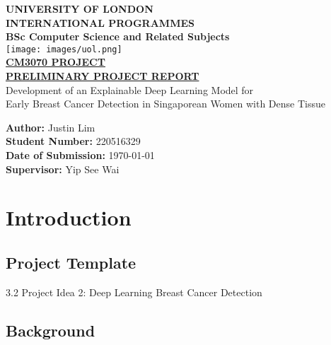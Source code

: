 \documentclass[12pt]{article}
\begin{document}
\begin{titlepage}
    \centering
    \vspace*{2cm}

    {\LARGE\bfseries UNIVERSITY OF LONDON \\[0.5em]
    \large INTERNATIONAL PROGRAMMES}\\[2em]

    {\Large\bfseries BSc Computer Science and Related Subjects}\\[3em]

    \texttt{[image: images/uol.png]}\\[3em]

    {\Large\bfseries \underline{CM3070 PROJECT}\\
    \underline{PRELIMINARY PROJECT REPORT}}\\[3em]

    {\Large Development of an Explainable Deep Learning Model for}\\[0.5em]
    {\Large Early Breast Cancer Detection in Singaporean Women with Dense Tissue}\\[5em]

    \begin{flushleft}
        \textbf{Author:} Justin Lim\\
        \textbf{Student Number:} 220516329\\
        \textbf{Date of Submission:} \today\\
        \textbf{Supervisor:} Yip See Wai
    \end{flushleft}

    \vfill


\tableofcontents
\end{titlepage}

\newpage
\section{Introduction}
\label{chapter1}

\subsection{Project Template}
3.2 Project Idea 2: Deep Learning Breast Cancer Detection

\subsection{Background}
\end{document}
